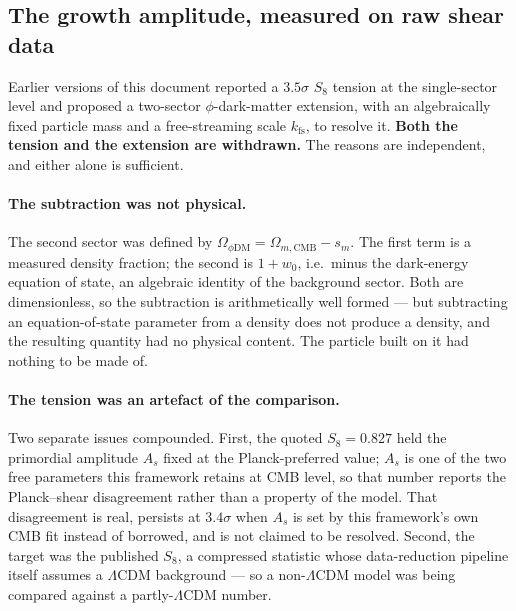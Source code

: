 \documentclass[12pt,a4paper]{article}
\newcommand{\sm}{s_m}
\newcommand{\OmmCMB}{\Omega_{m,\mathrm{CMB}}}
\newcommand{\kfs}{k_{\mathrm{fs}}}
\begin{document}
\subsection{The growth amplitude, measured on raw shear data}
\label{sec:growth_raw}

Earlier versions of this document reported a $3.5\sigma$ $S_8$ tension at the
single-sector level and proposed a two-sector $\phi$-dark-matter extension, with
an algebraically fixed particle mass and a free-streaming scale $\kfs$, to
resolve it. \textbf{Both the tension and the extension are withdrawn.} The
reasons are independent, and either alone is sufficient.

\paragraph{The subtraction was not physical.} The second sector was defined by
$\Omega_{\phi\mathrm{DM}}=\OmmCMB-\sm$. The first term is a measured density
fraction; the second is $1+w_0$, i.e.\ minus the dark-energy equation of state,
an algebraic identity of the background sector. Both are dimensionless, so the
subtraction is arithmetically well formed --- but subtracting an
equation-of-state parameter from a density does not produce a density, and the
resulting quantity had no physical content. The particle built on it had
nothing to be made of.

\paragraph{The tension was an artefact of the comparison.} Two separate issues
compounded. First, the quoted $S_8=0.827$ held the primordial amplitude $A_s$
fixed at the Planck-preferred value; $A_s$ is one of the two free parameters
this framework retains at CMB level, so that number reports the Planck--shear
disagreement rather than a property of the model. That disagreement is real,
persists at $3.4\sigma$ when $A_s$ is set by this framework's own CMB fit
instead of borrowed, and is not claimed to be resolved. Second,
the target was the published $S_8$, a compressed statistic whose
data-reduction pipeline itself assumes a $\Lambda$CDM background --- so a
non-$\Lambda$CDM model was being compared against a partly-$\Lambda$CDM number.
\end{document}
